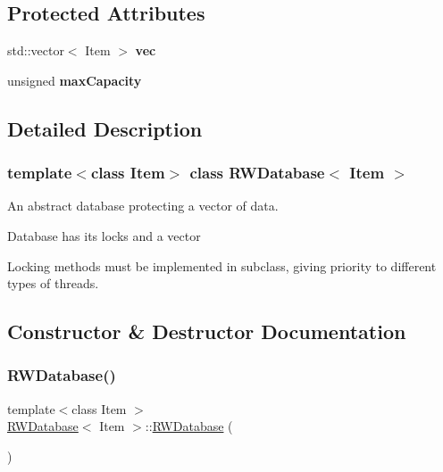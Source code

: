 \subsection*{Protected Attributes}
\begin{DoxyCompactItemize}
\item 
\mbox{\label{class_r_w_database_a27c74ad4eb0048078b6c395883fbf1e4}} 
std\+::vector$<$ Item $>$ {\bfseries vec}
\item 
\mbox{\label{class_r_w_database_a219c4621156200ef43c1508e16ee672f}} 
unsigned {\bfseries max\+Capacity}
\end{DoxyCompactItemize}


\subsection{Detailed Description}
\subsubsection*{template$<$class Item$>$\newline
class R\+W\+Database$<$ Item $>$}

An abstract database protecting a vector of data. 

Database has its locks and a vector

Locking methods must be implemented in subclass, giving priority to different types of threads. 

\subsection{Constructor \& Destructor Documentation}
\mbox{\label{class_r_w_database_ab6e78a49fcfe2e296b7d7695c1404dd5}} 
\subsubsection{\texorpdfstring{R\+W\+Database()}{RWDatabase()}\hspace{0.1cm}{\footnotesize\ttfamily [1/2]}}
{\footnotesize\ttfamily template$<$class Item $>$ \\
\hyperlink{class_r_w_database}{R\+W\+Database}$<$ Item $>$\+::\hyperlink{class_r_w_database}{R\+W\+Database} (\begin{DoxyParamCaption}{ }\end{DoxyParamCaption})}



